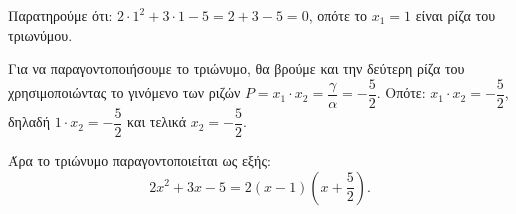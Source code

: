 
\begin{alist}
\item Παρατηρούμε ότι: $2 \cdot 1^2 + 3 \cdot 1 - 5 = 2 + 3 - 5 = 0$, οπότε το $x_1 = 1$ είναι ρίζα του τριωνύμου.

\item Για να παραγοντοποιήσουμε το τριώνυμο, θα βρούμε και την δεύτερη ρίζα του
χρησιμοποιώντας το γινόμενο των ριζών $P = x_1 \cdot x_2 = \dfrac{\gamma}{\alpha} = -\dfrac{5}{2}$.
Οπότε:
$x_1 \cdot x_2 = -\dfrac{5}{2}$, δηλαδή $1 \cdot x_2 = -\dfrac{5}{2}$ και τελικά $x_2 = -\dfrac{5}{2}$.

Άρα το τριώνυμο παραγοντοποιείται ως εξής:
\[2x^2 + 3x - 5 = 2(x - 1)\left(x + \dfrac{5}{2}\right).\]
\end{alist}

